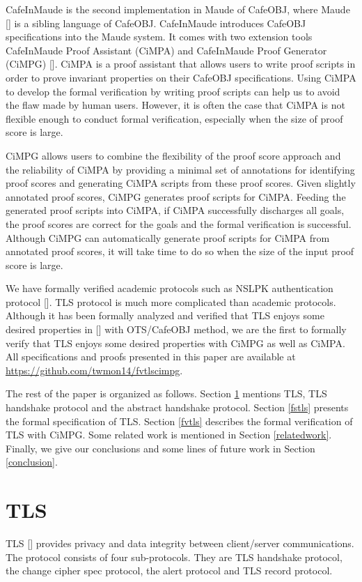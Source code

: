 \documentclass[a4paper,fleqn]{cas-dc}
\begin{document}
CafeInMaude is the second implementation in Maude of CafeOBJ, where Maude [\cite{ClavelEtal2007maude}] is a sibling language of CafeOBJ.
CafeInMaude introduces CafeOBJ specifications into the Maude system.
It comes with two extension tools CafeInMaude Proof Assistant (CiMPA) and CafeInMaude Proof Generator (CiMPG) [\cite{RiescoO18tosem}]. CiMPA is a proof assistant that allows users to write proof scripts in order to prove invariant properties on their CafeOBJ specifications. Using CiMPA to develop the formal verification by writing proof scripts can help us to avoid the flaw made by human users. However, it is often the case that CiMPA is not flexible enough to conduct formal verification, especially when the size of proof score is large. 

CiMPG allows users to combine the flexibility of the proof score approach and the reliability of CiMPA by providing a minimal set of annotations for identifying proof scores and generating CiMPA scripts from these proof scores. Given slightly annotated proof scores, CiMPG generates proof scripts for CiMPA. Feeding the generated proof scripts into CiMPA, if CiMPA successfully discharges all goals, the proof scores are correct for the goals and the formal verification is successful. Although CiMPG can automatically generate proof scripts for CiMPA from annotated proof scores, it will take time to do so when the size of the input proof score is large.

We have formally verified academic protocols
such as NSLPK authentication protocol [\cite{twmon}]. TLS protocol is much more complicated than academic protocols. Although it has been formally analyzed and verified that TLS enjoys some desired properties in [\cite{1437139}] with OTS/CafeOBJ method, we are the first to formally verify that TLS enjoys some desired properties with CiMPG as  well as CiMPA. 
All specifications and proofs presented in this paper are available at \url{https://github.com/twmon14/fvtlscimpg}.

The rest of the paper is organized as follows. Section \ref{tls} mentions TLS, TLS handshake protocol and the abstract handshake protocol. Section \ref{fstls} presents the formal specification of TLS. Section \ref{fvtls} describes the formal verification of TLS with CiMPG. Some related work is mentioned in Section \ref{relatedwork}. Finally, we give our conclusions and some lines of future work in Section \ref{conclusion}.
	
\section{TLS}\label{tls}
TLS [\cite{dierk}] provides privacy and data integrity between client/server communications. The protocol consists of four sub-protocols. They are TLS handshake protocol, the change cipher spec protocol, the alert protocol and TLS record protocol. 
\end{document}
